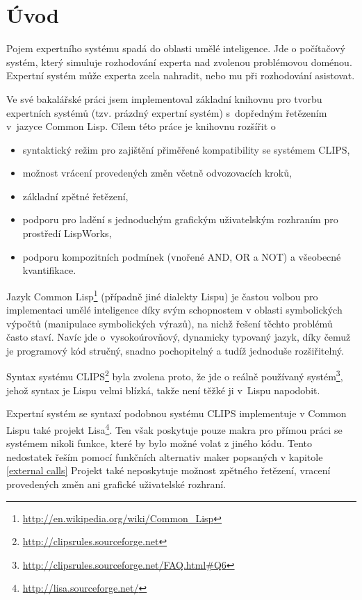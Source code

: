 \section{Úvod}

Pojem expertního systému spadá do oblasti umělé inteligence. Jde o počítačový
systém, který simuluje rozhodování experta nad zvolenou problémovou doménou.
Expertní systém může experta zcela nahradit, nebo mu při rozhodování asistovat.

Ve své bakalářské práci \cite{bakalarka} jsem implementoval základní knihovnu
pro tvorbu expertních systémů (tzv. prázdný expertní systém) s~dopředným
řetězením v~jazyce Common Lisp. Cílem této práce je knihovnu rozšířit o
\begin{itemize}
  \item syntaktický režim pro zajištění přiměřené kompatibility se systémem
    CLIPS,
  \item možnost vrácení provedených změn včetně odvozovacích kroků,
  \item základní zpětné řetězení,
  \item podporu pro ladění s jednoduchým grafickým uživatelským rozhraním pro
    prostředí LispWorks\texttrademark,
  \item podporu kompozitních podmínek (vnořené AND, OR a NOT) a všeobecné
    kvantifikace.
\end{itemize}

Jazyk Common Lisp\footnote{\url{http://en.wikipedia.org/wiki/Common\_Lisp}}
(případně jiné dialekty Lispu) je častou volbou pro implementaci umělé
inteligence díky svým schopnostem v oblasti symbolických výpočtů (manipulace
symbolických výrazů), na nichž řešení těchto problémů často staví. Navíc jde
o~vysokoúrovňový, dynamicky typovaný jazyk, díky čemuž je programový kód
stručný, snadno pochopitelný a tudíž jednoduše rozšiřitelný.

Syntax systému CLIPS\footnote{\url{http://clipsrules.sourceforge.net}} byla
zvolena proto, že jde o reálně používaný
systém\footnote{\url{http://clipsrules.sourceforge.net/FAQ.html\#Q6}}, jehož
syntax je Lispu velmi blízká, takže není těžké ji v~Lispu napodobit.

Expertní systém se syntaxí podobnou systému CLIPS implementuje v Common Lispu
také projekt Lisa\footnote{\url{http://lisa.sourceforge.net/}}. Ten však
poskytuje pouze makra pro přímou práci se systémem nikoli funkce, které by bylo
možné volat z jiného kódu. Tento nedostatek řeším pomocí funkčních alternativ
maker popsaných v kapitole \ref{external calls} Projekt také neposkytuje možnost
zpětného řetězení, vracení provedených změn ani grafické uživatelské rozhraní.
